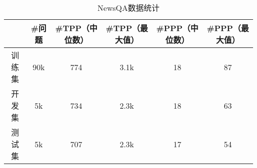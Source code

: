 \begin{table}[htbp]
    \centering
    \caption{NewsQA数据统计}
    \label{tab:2-2}
    \begin{tabular}{cccccc}
        \hline
        & \#问题 & \#TPP（中位数） & \#TPP（最大值） & \#PPP（中位数）& \#PPP（最大值） \\
        \hline
        训练集 & 90k & 774 & 3.1k & 18 & 87 \\
        开发集 & 5k & 734 & 2.3k & 18 & 63 \\
        测试集 & 5k & 707 & 2.3k & 17 & 54 \\
        \hline
    \end{tabular}
\end{table}

